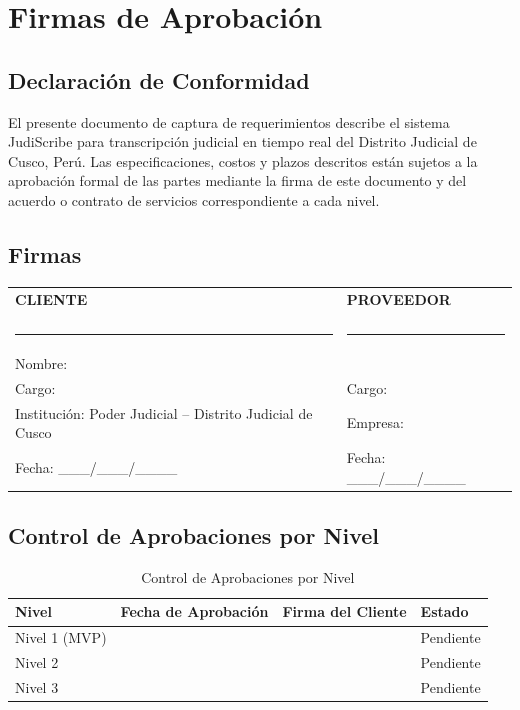 \documentclass[12pt,a4paper]{report}
\begin{document}
\chapter{Firmas de Aprobación}

\section{Declaración de Conformidad}

El presente documento de captura de requerimientos describe el sistema JudiScribe para transcripción judicial en tiempo real del Distrito Judicial de Cusco, Perú. Las especificaciones, costos y plazos descritos están sujetos a la aprobación formal de las partes mediante la firma de este documento y del acuerdo o contrato de servicios correspondiente a cada nivel.

\section{Firmas}

\vspace{2cm}

\begin{table}[H]
\centering
\begin{tabular}{p{7cm}p{7cm}}
\textbf{CLIENTE} & \textbf{PROVEEDOR} \\[0.5cm]
& \\[0.5cm]
\rule{6cm}{0.4pt} & \rule{6cm}{0.4pt} \\
Nombre: & \\
Cargo: & Cargo: \\
Institución: Poder Judicial -- Distrito Judicial de Cusco & Empresa: \\
Fecha: \_\_\_/\_\_\_/\_\_\_\_ & Fecha: \_\_\_/\_\_\_/\_\_\_\_ \\
\end{tabular}
\end{table}

\vspace{2cm}

\section{Control de Aprobaciones por Nivel}

\begin{table}[H]
\centering
\begin{tabular}{|p{2.5cm}|p{4cm}|p{4cm}|p{3cm}|}
\hline
\rowcolor{primaryblue!20}
\textbf{Nivel} & \textbf{Fecha de Aprobación} & \textbf{Firma del Cliente} & \textbf{Estado} \\
\hline
Nivel 1 (MVP) & & & Pendiente \\
\hline
Nivel 2 & & & Pendiente \\
\hline
Nivel 3 & & & Pendiente \\
\hline
\end{tabular}
\caption{Control de Aprobaciones por Nivel}
\end{table}
\end{document}
